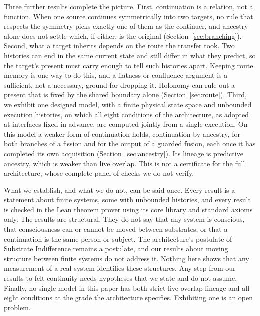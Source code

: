 Three further results complete the picture. First, continuation is a
relation, not a function. When one source continues symmetrically into two
targets, no rule that respects the symmetry picks exactly one of them as the
continuer, and ancestry alone does not settle which, if either, is the
original (Section~\ref{sec:branching}). Second, what a target inherits
depends on the route the transfer took. Two histories can end in the same
current state and still differ in what they predict, so the target's present
must carry enough to tell such histories apart. Keeping route memory is one way
to do this, and a flatness or confluence argument is a sufficient, not a
necessary, ground for dropping it. Holonomy can rule out a present that is fixed by the shared boundary alone
(Section~\ref{sec:route}). Third, we exhibit one designed model, with a finite
physical state space and unbounded execution histories, on which all eight
conditions of the architecture, as adopted at interfaces fixed in advance, are
computed jointly from a single execution. On this model a weaker form of
continuation holds, continuation by ancestry, for both branches of a fission
and for the output of a guarded fusion, each once it has completed its own
acquisition (Section~\ref{sec:ancestry}). Its lineage is predictive ancestry,
which is weaker than live overlap. This is
not a certificate for the full architecture, whose complete panel of checks we
do not verify.

What we establish, and what we do not, can be said once. Every result is a
statement about finite systems, some with unbounded histories, and every
result is checked in the Lean theorem prover \citep{deMouraUllrich2021} using
its core library and standard axioms only. The results are structural. They
do not say that any system is conscious, that consciousness can or cannot be
moved between substrates, or that a continuation is the same person or
subject. The architecture's postulate of Substrate Indifference remains a
postulate, and our results about moving structure between finite systems do
not address it. Nothing here shows that any measurement of a real system identifies these
structures. Any step from our results to felt continuity needs hypotheses that
we state and do not assume. Finally, no single model in this
paper has both strict live-overlap lineage and all eight conditions at the
grade the architecture specifies. Exhibiting one is an open problem.

